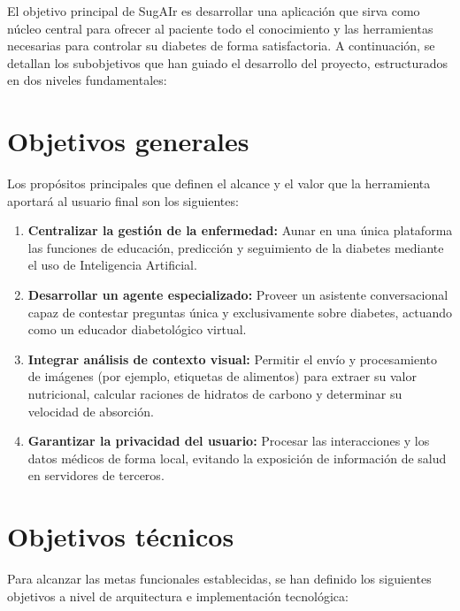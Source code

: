 El objetivo principal de SugAIr es desarrollar una aplicación que sirva como núcleo central para ofrecer al paciente todo el conocimiento y las herramientas necesarias para controlar su diabetes de forma satisfactoria. A continuación, se detallan los subobjetivos que han guiado el desarrollo del proyecto, estructurados en dos niveles fundamentales:

\section{Objetivos generales}

Los propósitos principales que definen el alcance y el valor que la herramienta aportará al usuario final son los siguientes:

\begin{enumerate}
    \item \textbf{Centralizar la gestión de la enfermedad:} Aunar en una única plataforma las funciones de educación, predicción y seguimiento de la diabetes mediante el uso de Inteligencia Artificial.
    \item \textbf{Desarrollar un agente especializado:} Proveer un asistente conversacional capaz de contestar preguntas única y exclusivamente sobre diabetes, actuando como un educador diabetológico virtual.
    \item \textbf{Integrar análisis de contexto visual:} Permitir el envío y procesamiento de imágenes (por ejemplo, etiquetas de alimentos) para extraer su valor nutricional, calcular raciones de hidratos de carbono y determinar su velocidad de absorción.
    \item \textbf{Garantizar la privacidad del usuario:} Procesar las interacciones y los datos médicos de forma local, evitando la exposición de información de salud en servidores de terceros.
\end{enumerate}

\section{Objetivos técnicos}

Para alcanzar las metas funcionales establecidas, se han definido los siguientes objetivos a nivel de arquitectura e implementación tecnológica:

